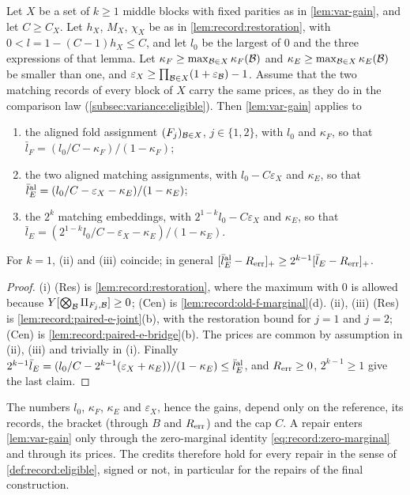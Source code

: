 \begin{corollary}\label{cor:var-classes}
Let $X$ be a set of $k\ge1$ middle blocks with fixed parities as in
\cref{lem:var-gain}, and let $C\ge C_X$. Let $h_X$, $M_X$, $\chi_X$ be as in
\cref{lem:record:restoration}, with $0<l=1-(C-1)h_X\le C$, and let $l_0$ be the
largest of $0$ and the three expressions of that lemma. Let
$\kappa_F\ge\max_{\mathcal B\in X}\kappa_F(\mathcal B)$ and $\kappa_E\ge\max_{\mathcal B\in X}
\kappa_E(\mathcal B)$ be smaller than one, and $\varepsilon_X\ge\prod_{\mathcal B\in X}(1+
\varepsilon_\mathcal B)-1$. Assume that the two matching records of every block of $X$
carry the same prices, as they do in the comparison law
(\cref{subsec:variance:eligible}). Then \cref{lem:var-gain} applies to
\begin{enumerate}[label=(\roman*)]
\item the aligned fold assignment $(F_j)_{\mathcal B\in X}$, $j\in\{1,2\}$, with
 $l_0$ and $\kappa_F$, so that $\bar l_F=(l_0/C-\kappa_F)/(1-\kappa_F)$;
\item the two aligned matching assignments, with $l_0-C\varepsilon_X$ and
 $\kappa_E$, so that $\bar l^{\rm al}_E=(l_0/C-\varepsilon_X-\kappa_E)/(1-\kappa_E)$;
\item the $2^k$ matching embeddings, with $2^{1-k}l_0-C\varepsilon_X$ and
 $\kappa_E$, so that $\bar l_E=(2^{1-k}l_0/C-\varepsilon_X-\kappa_E)/(1-\kappa_E)$.
\end{enumerate}
For $k=1$, (ii) and (iii) coincide; in general
$[\bar l^{\rm al}_E-R_{\rm err}]_+\ge2^{k-1}[\bar l_E-R_{\rm err}]_+$.
\end{corollary}

\begin{proof}
(i) (Res) is \cref{lem:record:restoration}, where the maximum with $0$ is
allowed because $Y[\bigotimes_\mathcal B\Pi_{F_j,\mathcal B}]\ge0$; (Cen) is
\cref{lem:record:old-f-marginal}(d). (ii), (iii) (Res) is
\cref{lem:record:paired-e-joint}(b), with the restoration bound for $j=1$ and
$j=2$; (Cen) is \cref{lem:record:paired-e-bridge}(b). The prices are common by
assumption in (ii), (iii) and trivially in (i). Finally
$2^{k-1}\bar l_E=(l_0/C-2^{k-1}(\varepsilon_X+\kappa_E))/(1-\kappa_E)\le
\bar l^{\rm al}_E$, and $R_{\rm err}\ge0$, $2^{k-1}\ge1$ give the last claim.
\end{proof}

\begin{remark}\label{rem:variance:independence}
The numbers $l_0$, $\kappa_F$, $\kappa_E$ and $\varepsilon_X$, hence the gains,
depend only on the reference, its records, the bracket (through $B$ and
$R_{\rm err}$) and the cap $C$. A repair enters \cref{lem:var-gain} only through
the zero-marginal identity \eqref{eq:record:zero-marginal} and through its
prices. The credits therefore hold for every repair in the sense of
\cref{def:record:eligible}, signed or not, in particular for the repairs of the
final construction.
\end{remark}

